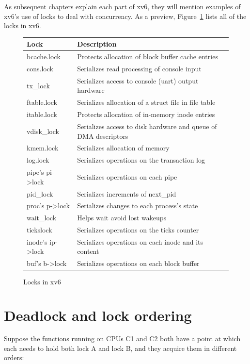 As subsequent chapters explain each part of xv6, they
will mention examples of xv6's use of locks
to deal with concurrency.
As a preview,
Figure~\ref{fig:locktable}
lists all of the locks in xv6.

\begin{figure}[t]
\center
\begin{tabular}{ll}
{\bf Lock} & {\bf Description} \\
\midrule
bcache.lock & Protects allocation of block buffer cache entries \\
cons.lock & Serializes read processing of console input \\
tx\_lock & Serializes access to console (uart) output hardware \\
ftable.lock & Serializes allocation of a struct file in file table \\
itable.lock & Protects allocation of in-memory inode entries \\
vdisk\_lock & Serializes access to disk hardware and queue of DMA descriptors \\
kmem.lock & Serializes allocation of memory \\
log.lock & Serializes operations on the transaction log \\
pipe's pi->lock & Serializes operations on each pipe \\
pid\_lock & Serializes increments of next\_pid \\
proc's p->lock & Serializes changes to each process's state \\
wait\_lock & Helps wait avoid lost wakeups \\
tickslock & Serializes operations on the ticks counter \\
inode's ip->lock & Serializes operations on each inode and its content \\
buf's b->lock & Serializes operations on each block buffer \\
\end{tabular}
\caption{Locks in xv6}
\label{fig:locktable}
\end{figure}

\newpage
\section{Deadlock and lock ordering}

Suppose the functions running on CPUs C1 and C2 both have a point at
which each needs to hold both lock A and lock B, and they acquire them
in different orders:

